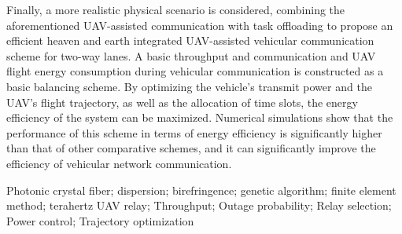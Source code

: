 Finally, a more realistic physical scenario is considered, combining the aforementioned UAV-assisted communication with task offloading to propose an
efficient heaven and earth integrated UAV-assisted vehicular communication scheme for two-way lanes. A basic throughput and communication and UAV flight
energy consumption during vehicular communication is constructed as a basic balancing scheme. By optimizing the vehicle's transmit power and the UAV's flight
trajectory, as well as the allocation of time slots, the energy efficiency of the system can be maximized. Numerical simulations show that the performance of
this scheme in terms of energy efficiency is significantly higher than that of other comparative schemes, and it can significantly improve the efficiency of
vehicular network communication.

\begin{englishkeywords}
Photonic crystal fiber; dispersion; birefringence; genetic algorithm; finite element method; terahertz
UAV relay; Throughput; Outage probability; Relay selection; Power control; Trajectory optimization
\end{englishkeywords}

\cleardoublepage%

\makeatletter
{}
\pagestyle{fancy}
  \fancyhf{}
\makeatother

